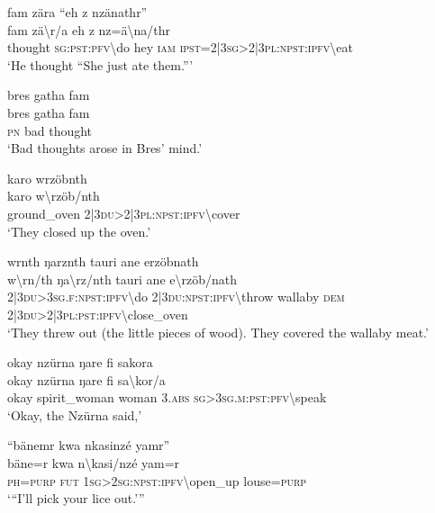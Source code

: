\ea\label{ex:8:a1715}
fam zära ``eh z nzänathr''\\
\gll fam	zä{\textbackslash}r/a	eh	z	nz=ä{\textbackslash}na/thr\\
     thought	\textsc{sg}:\textsc{pst}:\textsc{pfv}{\textbackslash}do	hey	\textsc{iam}	\textsc{ipst}=2|3\textsc{sg}>2|3\textsc{pl}:\textsc{npst}:\textsc{ipfv}{\textbackslash}eat\\
\glt `He thought ``She just ate them.'''
\z

\ea\label{ex:8:a1716}
bres gatha fam\\
\gll bres	gatha	fam\\
     \textsc{pn}	bad	thought\\
\glt `Bad thoughts arose in Bres' mind.'
\z

\ea\label{ex:8:a1717}
karo wrzöbnth\\
\gll karo	w{\textbackslash}rzöb/nth\\
     ground\_oven	2|3\textsc{du}>2|3\textsc{pl}:\textsc{npst}:\textsc{ipfv}{\textbackslash}cover\\
\glt `They closed up the oven.'
\z

\ea\label{ex:8:a1718}
wrnth ŋarznth tauri ane erzöbnath\\
\gll w{\textbackslash}rn/th	ŋa{\textbackslash}rz/nth	tauri	ane	e{\textbackslash}rzöb/nath\\
     2|3\textsc{du}>3\textsc{sg}.\textsc{f}:\textsc{npst}:\textsc{ipfv}{\textbackslash}do	2|3\textsc{du}:\textsc{npst}:\textsc{ipfv}{\textbackslash}throw	wallaby	\textsc{dem}	2|3\textsc{du}>2|3\textsc{pl}:\textsc{pst}:\textsc{ipfv}{\textbackslash}close\_oven\\
\glt `They threw out (the little pieces of wood). They covered the wallaby meat.'
\z

\ea\label{ex:8:a1719}
okay nzürna ŋare fi sakora\\
\gll okay	nzürna	ŋare	fi	sa{\textbackslash}kor/a\\
     okay	spirit\_woman	woman	3.\textsc{abs}	\textsc{sg}>3\textsc{sg}.\textsc{m}:\textsc{pst}:\textsc{pfv}{\textbackslash}speak\\
\glt `Okay, the Nzürna said,'
\z

\ea\label{ex:8:a1721}
``bänemr kwa nkasinzé yamr''\\
\gll bäne=r	kwa	n{\textbackslash}kasi/nzé	yam=r\\
     \textsc{ph}=\textsc{purp}	\textsc{fut}	1\textsc{sg}>2\textsc{sg}:\textsc{npst}:\textsc{ipfv}{\textbackslash}open\_up	louse=\textsc{purp}\\
\glt `{``}I'll pick your lice out.'''
\z

